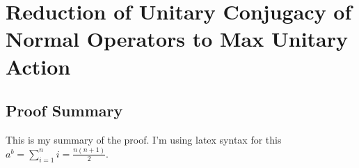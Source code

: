 \documentclass{article}
\begin{document}

\section{Reduction of Unitary Conjugacy of Normal Operators to Max Unitary Action}

\subsection{Proof Summary}

This is my summary of the proof.
I'm using latex syntax for this $a^{b} = \sum\limits_{i=1}^{n} i = \frac{n(n+1)}{2}$.








\end{document}
